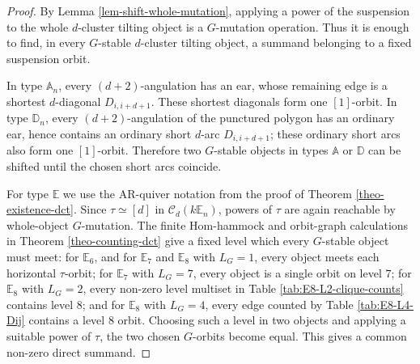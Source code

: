 \documentclass[12pt]{article}
\theoremstyle{plain}
\theoremstyle{definition}
\begin{document}
\begin{proof}
By Lemma \ref{lem-shift-whole-mutation}, applying a power of the suspension to
the whole \(d\)-cluster tilting object is a \(G\)-mutation operation.  Thus it
is enough to find, in every \(G\)-stable \(d\)-cluster tilting object, a summand
belonging to a fixed suspension orbit.

In type \(\mathbb A_n\), every \((d+2)\)-angulation has an ear, whose remaining
edge is a shortest \(d\)-diagonal \(D_{i,i+d+1}\).  These shortest diagonals
form one \([1]\)-orbit.  In type \(\mathbb D_n\), every \((d+2)\)-angulation of
the punctured polygon has an ordinary ear, hence contains an ordinary short
\(d\)-arc \(D_{i,i+d+1}\); these ordinary short arcs also form one
\([1]\)-orbit.  Therefore two \(G\)-stable objects in types \(\mathbb A\) or
\(\mathbb D\) can be shifted until the chosen short arcs coincide.

For type $\mathbb{E}$ we use the AR-quiver notation from the proof of Theorem
\ref{theo-existence-dct}.  Since \(\tau\simeq[d]\) in
\(\mathcal C_d(k\mathbb E_n)\), powers of \(\tau\) are again reachable by
whole-object \(G\)-mutation.  The finite Hom-hammock and orbit-graph
calculations in Theorem \ref{theo-counting-dct} give a fixed level which every
\(G\)-stable object must meet: for \(\mathbb E_6\), and for \(\mathbb E_7\) and
\(\mathbb E_8\) with \(L_G=1\), every object meets each horizontal
\(\tau\)-orbit; for \(\mathbb E_7\) with \(L_G=7\), every object is a single
orbit on level \(7\); for \(\mathbb E_8\) with \(L_G=2\), every non-zero level
multiset in Table \ref{tab:E8-L2-clique-counts} contains level \(8\); and for
\(\mathbb E_8\) with \(L_G=4\), every edge counted by Table
\ref{tab:E8-L4-Dij} contains a level \(8\) orbit.  Choosing such a level in two
objects and applying a suitable power of \(\tau\), the two chosen \(G\)-orbits
become equal.  This gives a common non-zero  direct summand.
\end{proof}
\end{document}
